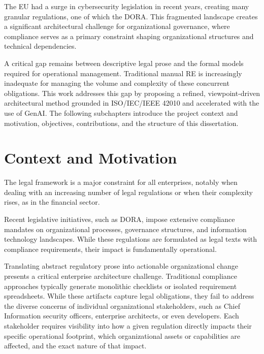 \label{chap:intro}

The \ac{EU} had a surge in cybersecurity legislation in recent years, creating many granular regulations, one of which the \ac{DORA}. This fragmented landscape creates a significant architectural challenge for organizational governance, where compliance serves as a primary constraint shaping organizational structures and technical dependencies.

A critical gap remains between descriptive legal prose and the formal models required for operational management. Traditional manual \ac{RE} is increasingly inadequate for managing the volume and complexity of these concurrent obligations. This work addresses this gap by proposing a refined, viewpoint-driven architectural method grounded in ISO/IEC/IEEE 42010 and accelerated with the use of \ac{GenAI}. The following subchapters introduce the project context and motivation, objectives,  contributions, and the structure of this dissertation.
\section{Context and Motivation}

The legal framework is a major constraint for all enterprises, notably when dealing with an increasing number of legal regulations or when their complexity rises, as in the financial sector\cite{practiceEnterpriseModelling}.

Recent legislative initiatives, such as \ac{DORA}, impose extensive compliance mandates on organizational processes, governance structures, and information technology landscapes. While these regulations are formulated as legal texts with compliance requirements, their impact is fundamentally operational.

Translating abstract regulatory prose into actionable organizational change presents a critical enterprise architecture challenge. Traditional compliance approaches typically generate monolithic checklists or isolated requirement spreadsheets. While these artifacts capture legal obligations, they fail to address the diverse concerns of individual organizational stakeholders, such as Chief Information security officers, enterprise architects, or even developers. Each stakeholder requires visibility into how a given regulation directly impacts their specific operational footprint, which organizational assets or capabilities are affected, and the exact nature of that impact.

